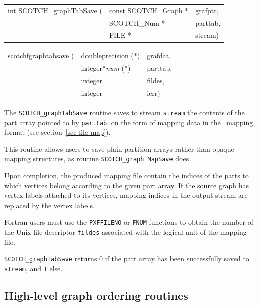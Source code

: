 \begin{itemize}
\progsyn

{\tt\begin{tabular}{l@{}ll}
int SCOTCH\_graphTabSave ( & const SCOTCH\_Graph * & grafptr, \\
                           & SCOTCH\_Num *         & parttab, \\
                           & FILE *                & stream)
\end{tabular}}

{\tt\begin{tabular}{l@{}ll}
scotchfgraphtabsave ( & doubleprecision (*)   & grafdat, \\
                      & integer*{\it num} (*) & parttab, \\
                      & integer               & fildes,  \\
                      & integer               & ierr)
\end{tabular}}

\progdes

The {\tt SCOTCH\_graphTabSave} routine saves to stream {\tt stream}
the contents of the part array pointed to by \texttt{parttab}, on the
form of mapping data in the \scotch\ mapping format (see
section~\ref{sec-file-map}).

This routine allows users to save plain partition arrays rather than
opaque mapping structures, as routine \texttt{SCOTCH\_\lbt graph\lbt
Map\lbt Save} does.

Upon completion, the produced mapping file contain the indices of the
parts to which vertices belong according to the given part array. If
the source graph has vertex labels attached to its vertices, mapping
indices in the output stream are replaced by the vertex labels.

Fortran users must use the {\tt PXFFILENO} or {\tt FNUM} functions to
obtain the number of the Unix file descriptor {\tt fildes} associated
with the logical unit of the mapping file.

\progret

{\tt SCOTCH\_graphTabSave} returns $0$ if the part array
has been successfully saved to  \texttt{stream}, and $1$ else.
\end{itemize}

\subsection{High-level graph ordering routines}

